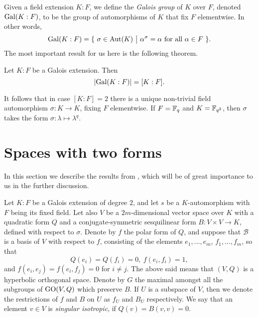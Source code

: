 Given a field extension $K : F$, we define the \textit{Galois group} of $K$ over $F$, denoted
\mbox{$\mathrm{Gal}(K : F)$}, to be the group
of automorphisms of $K$ that fix $F$ elementwise. In other words,
\begin{equation}
	\Gal(K : F) = \{\ \sigma \in \Aut(K)\ \big|\ \alpha^{\sigma} = \alpha\ \mbox{for all}\ 
		\alpha \in F\ \}.
\end{equation}
The most important result for us here is the following theorem.
\begin{theorem}
	Let $K : F$ be a Galois extension. Then
	\begin{equation}
		| \mathrm{Gal}(K : F) | = [K : F].
	\end{equation}
\end{theorem}
It follows that in case $[K:F] = 2$ there is a unique non-trivial field automorphism 
$\sigma : K \rightarrow K$, fixing $F$ elementwise. If $F = \mathbb{F}_q$ and $K = \mathbb{F}_{q^2}$, then
$\sigma$ takes the form $\sigma : \lambda \mapsto \lambda^q$. 


\section{Spaces with two forms}

In this section we describe the results
from \cite[Section 11]{Asch1}, which will
be of great importance to us in the further
discussion.

Let $K : F$ be a Galois extension of degree $2$, 
and let $s$ be a $K$-automorphism
with $F$ being its fixed field. Let also $V$ be a $2m$-dimensional vector space over $K$ with 
a quadratic form $Q$ and a conjugate-symmetric sesquilinear form 
\mbox{$B : V\times V \rightarrow K$},
defined with respect to $\sigma$. Denote by $f$ the polar form of $Q$, and suppose that 
\mbox{$\mathcal{B}$}
is a basis of $V$ with respect to $f$, consisting of the elements
$e_1, ..., e_m$, $f_1,...,f_m$, so that
\begin{equation}
	Q(e_i) = Q(f_i) = 0,\ f(e_i, f_i) = 1,
\end{equation}
and $f(e_i,e_j) = f(e_i,f_j) = 0$ for $i \neq j$. The above said means that $(V,Q)$ is a hyperbolic
orthogonal space. Denote by $G$ the maximal amongst all the subgroups of 
$\mathrm{GO}(V, Q)$ which preserve $B$. If $U$ 
is a subspace of $V$, then we denote the restrictions of $f$ and $B$ on $U$ as $f_U$ and $B_U$ 
respectively. We say that an element $v \in V$ is \textit{singular isotropic}, if $Q(v) = B(v,v) = 0$. 

